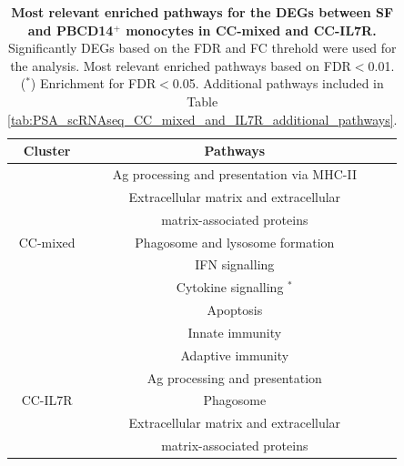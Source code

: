 \begin{table}[htbp]
\centering
\begin{tabular}{@{} c c c}
\toprule
\textbf{Cluster} & \textbf{Pathways} \\
\midrule
\midrule
         & Ag processing and presentation via MHC-II \\
				 & Extracellular matrix and extracellular \\
				 & matrix-associated proteins \\
CC-mixed & Phagosome and lysosome formation \\
				 & IFN signalling \\
				 & Cytokine signalling $^\ast$ \\
				 & Apoptosis \\
				 & Innate immunity \\
\midrule				
         & Adaptive immunity \\
         & Ag processing and presentation \\
CC-IL7R	 & Phagosome \\
         & Extracellular matrix and extracellular \\
				 & matrix-associated proteins \\
\bottomrule
\end{tabular}
\medskip %
\caption[Most relevant enriched pathways for the DEGs between SF and PBCD14$^+$ monocytes in CC-mixed and CC-IL7R.]{\textbf{Most relevant enriched pathways for the DEGs between SF and PBCD14$^+$ monocytes in CC-mixed and CC-IL7R.} Significantly DEGs based on the FDR and FC threhold were used for the analysis. Most relevant enriched pathways based on FDR$<$0.01. ($^\ast$) Enrichment for FDR$<$0.05. Additional pathways included in Table \ref{tab:PSA_scRNAseq_CC_mixed_and_IL7R_additional_pathways}.}
\label{tab:PSA_scRNAseq_CD14_DEGs_pathway_analysis}
\end{table}




